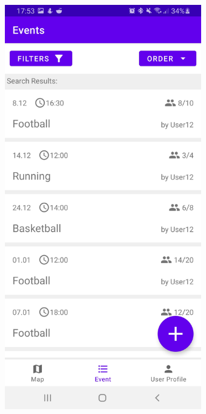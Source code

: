 \documentclass[aspectratio=169]{beamer}
\begin{document}
\begin{frame}
\begin{columns}
\begin{figure}
				\centering
				\includegraphics[width=1\textwidth]{media/Events.jpg}
			\end{figure}
			 \begin{figure}

\end{figure}
\end{columns}
\end{frame}
\end{document}
